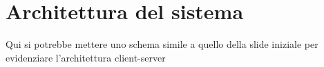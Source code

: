 \section{Architettura del sistema}


Qui si potrebbe mettere uno schema simile a quello della slide iniziale per evidenziare l'architettura client-server












